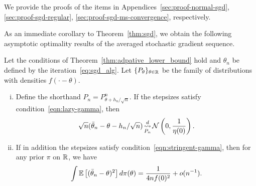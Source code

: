 \noindent
We provide the proofs of the items in Appendices~\ref{sec:proof-normal-sgd},
\ref{sec:proof-sgd-regular}, \ref{sec:proof-sgd-ms-convergence},
respectively.

As an immediate corollary to Theorem~\ref{thm:sgd}, we obtain the following
asymptotic optimality results of the averaged stochastic gradient
sequence.
\begin{corollary}
  Let the conditions of Theorem~\ref{thm:adpative_lower_bound} hold
  and $\theta_n$ be defined by the iteration~\eqref{eq:sgd_alg}.
  Let $\{P_\theta\}_{\theta \in \mathbb{R}}$ be the family of distributions
  with densities $f(\cdot - \theta)$.
  \begin{enumerate}[(i)]
  \item Define the shorthand $P_n = P_{\theta + h_n/\sqrt{n}}^n$.
    If the stepsizes satisfy condition~\eqref{eqn:lazy-gamma}, then
    \begin{equation*}
      \sqrt{n}(\bar{\theta}_n - \theta - h_n / \sqrt{n})
      \mathop{\stackrel{d}{\rightsquigarrow}}_{P_n} \mathcal{N}\left(0, \frac{1}{\eta(0)}\right).
    \end{equation*}
  \item If in addition the stepsizes satisfy
    condition~\eqref{eqn:stringent-gamma}, then for any
    prior $\pi$ on $\mathbb{R}$, we have
    \begin{equation*}
      \int \mathbb{E}\left[(\bar{\theta}_n - \theta)^2\right] d\pi(\theta)
      = \frac{1}{4 n f(0)^2} + o(n^{-1}).
    \end{equation*}
  \end{enumerate}
\end{corollary}
\noindent

